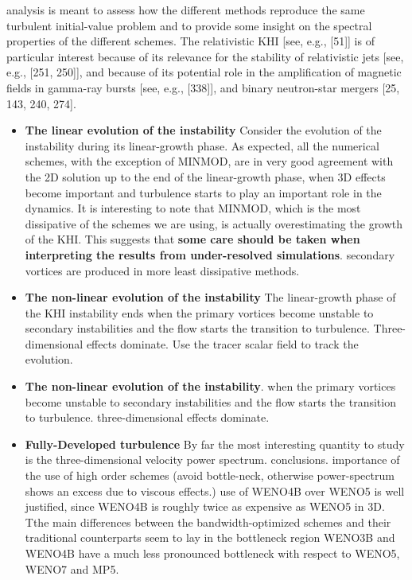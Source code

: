 \documentclass[11pt,a4paper,headinclude=true,DIV=14,BCOR=8mm,chapterprefix,listof=totoc,twoside,openright,abstracton]{scrbook}
\begin{document}
analysis is meant to assess how the different methods reproduce the same turbulent initial-value problem and to provide some insight on the spectral properties of the different schemes. The relativistic KHI [see, e.g., [51]] is of particular interest because of its relevance for the stability of relativistic jets [see, e.g., [251, 250]], and because of its potential role in the amplification of magnetic fields in gamma-ray bursts [see, e.g., [338]], and binary neutron-star mergers [25, 143, 240, 274].

\begin{itemize}
    \item \textbf{The linear evolution of the instability} Consider the evolution of the instability during its linear-growth phase. As expected, all the numerical schemes, with the exception of MINMOD, are in very good agreement with the 2D solution up to the end of the linear-growth phase, when 3D effects become important and turbulence starts to play an important role in the dynamics. It is interesting to note that MINMOD, which is the most dissipative of the schemes we are using, is actually overestimating the growth of the KHI.
    This suggests that \textbf{some care should be taken when interpreting the results from under-resolved simulations}. secondary vortices are produced in more least dissipative methods.
    \item \textbf{The non-linear evolution of the instability} The linear-growth phase of the KHI instability ends when the primary vortices become unstable to secondary instabilities and the flow starts the transition to turbulence. Three-dimensional effects dominate. Use the tracer scalar field to track the evolution.
    \item \textbf{The non-linear evolution of the instability}. when the primary vortices become unstable to secondary instabilities and the flow starts the transition to turbulence. three-dimensional effects dominate.
    \item \textbf{Fully-Developed turbulence} By far the most interesting quantity to study is the three-dimensional velocity power spectrum. conclusions. importance of the use of high order    schemes (avoid bottle-neck, otherwise power-spectrum shows an excess due to viscous effects.) use of WENO4B over WENO5 is well justified, since WENO4B is roughly twice as expensive as     WENO5 in 3D. Tthe main differences between the bandwidth-optimized schemes and their traditional counterparts seem to lay in the bottleneck region WENO3B and WENO4B have a much less pronounced bottleneck with respect to WENO5, WENO7 and MP5.
\end{itemize} 
\end{document}
